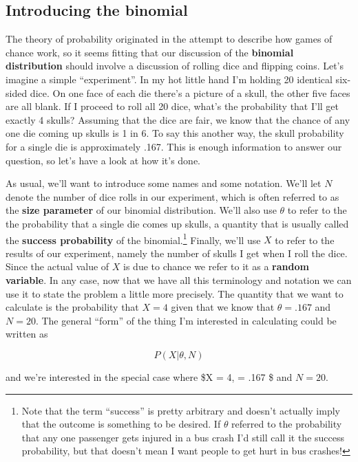\documentclass[
  letterpaper,
]{book}
\begin{document}
\hypertarget{introducing-the-binomial}{%
\subsection{Introducing the binomial}\label{introducing-the-binomial}}

The theory of probability originated in the attempt to describe how
games of chance work, so it seems fitting that our discussion of the
\textbf{binomial distribution} should involve a discussion of rolling
dice and flipping coins. Let's imagine a simple ``experiment''. In my
hot little hand I'm holding 20 identical six-sided dice. On one face of
each die there's a picture of a skull, the other five faces are all
blank. If I proceed to roll all 20 dice, what's the probability that
I'll get exactly 4 skulls? Assuming that the dice are fair, we know that
the chance of any one die coming up skulls is 1 in 6. To say this
another way, the skull probability for a single die is approximately
.167. This is enough information to answer our question, so let's have a
look at how it's done.

As usual, we'll want to introduce some names and some notation. We'll
let \(N\) denote the number of dice rolls in our experiment, which is
often referred to as the \textbf{size parameter} of our binomial
distribution. We'll also use \(\theta\) to refer to the the probability
that a single die comes up skulls, a quantity that is usually called the
\textbf{success probability} of the binomial.\footnote{Note that the
  term ``success'' is pretty arbitrary and doesn't actually imply that
  the outcome is something to be desired. If \(\theta\) referred to the
  probability that any one passenger gets injured in a bus crash I'd
  still call it the success probability, but that doesn't mean I want
  people to get hurt in bus crashes!} Finally, we'll use \(X\) to refer
to the results of our experiment, namely the number of skulls I get when
I roll the dice. Since the actual value of \(X\) is due to chance we
refer to it as a \textbf{random variable}. In any case, now that we have
all this terminology and notation we can use it to state the problem a
little more precisely. The quantity that we want to calculate is the
probability that \(X = 4\) given that we know that \(\theta = .167\) and
\(N = 20\). The general ``form'' of the thing I'm interested in
calculating could be written as

\[P(X|\theta,N)\]

and we're interested in the special case where \$X = 4, \theta = .167 \$
and \(N = 20\).
\end{document}
